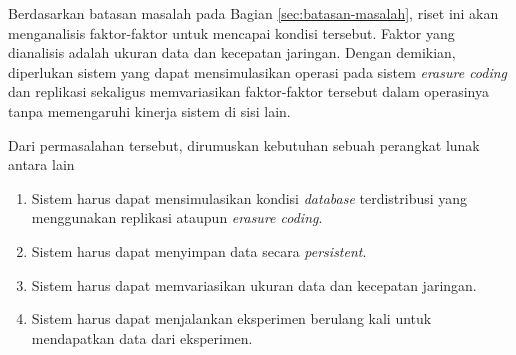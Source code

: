 Berdasarkan batasan masalah pada Bagian \ref{sec:batasan-masalah}, riset ini akan menganalisis faktor-faktor untuk mencapai kondisi tersebut. Faktor yang dianalisis adalah ukuran data dan kecepatan jaringan. Dengan demikian, diperlukan sistem yang dapat mensimulasikan operasi pada sistem \textit{erasure coding} dan replikasi sekaligus memvariasikan faktor-faktor tersebut dalam operasinya tanpa memengaruhi kinerja sistem di sisi lain.

Dari permasalahan tersebut, dirumuskan kebutuhan sebuah perangkat lunak antara lain
\begin{enumerate}

    \item Sistem harus dapat mensimulasikan kondisi \textit{database} terdistribusi yang menggunakan replikasi ataupun \textit{erasure coding}.
    \item Sistem harus dapat menyimpan data secara \textit{persistent}.
    \item Sistem harus dapat memvariasikan ukuran data dan kecepatan jaringan.
    \item Sistem harus dapat menjalankan eksperimen berulang kali untuk mendapatkan data dari eksperimen.

\end{enumerate}
